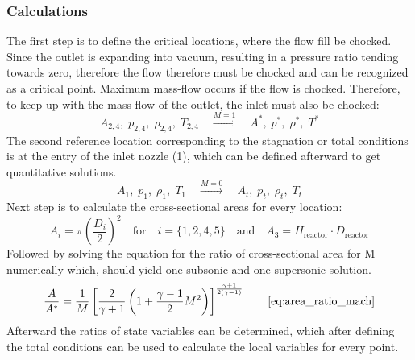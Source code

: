\subsubsection*{Calculations}

	The first step is to define the critical locations, where the flow fill be chocked.
	Since the outlet is expanding into vacuum, resulting in a pressure ratio tending towards zero, therefore the flow therefore must be chocked and can be recognized as a critical point.
	Maximum mass-flow occurs if the flow is chocked. Therefore, to keep up with the mass-flow of the outlet, the inlet must also be chocked: 
	$$
		A_{2,4},\;p_{2,4},\;\rho_{2,4},\;T_{2,4}\quad\xrightarrow{M=1}\quad A^*,\;p^*,\;\rho^*,\;T^*
	$$
	The second reference location corresponding to the stagnation or total conditions is at the entry of the inlet nozzle (1), which can be defined afterward to get quantitative solutions.
	$$
		A_1,\;p_1,\;\rho_1,\;T_1\quad\xrightarrow{M=0}\quad A_t,\;p_t,\;\rho_t,\;T_t
	$$
	Next step is to calculate the cross-sectional areas for every location:
	$$
		A_i = \pi \left(\frac{D_i}{2}\right)^2
			\quad \text{for} \quad
		i=\{1,2,4,5\}
			\quad \text{and} \quad
		A_3 = H_\text{reactor}\cdot D_\text{reactor}
	$$
	Followed by solving the equation for the ratio of cross-sectional area for M numerically which, should yield one subsonic and one supersonic solution.
	$$
		\frac{A}{A^*} = \frac{1}{M} \left[ \frac{2}{\gamma + 1} \left( 1 + \frac{\gamma - 1}{2} M^2 \right) \right]^{\frac{\gamma + 1}{2(\gamma - 1)}}
		\qquad \eqref{eq:area_ratio_mach}
	$$
	Afterward the ratios of state variables can be determined, which after defining the total conditions can be used to calculate the local variables for every point.
	\cite{hall_isentropic_nodate}

